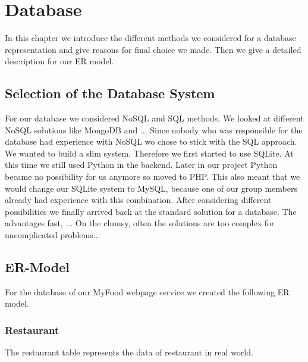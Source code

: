 \chapter{Database}

In this chapter we introduce the different methods we considered for a database representation and give reasons for final choice we made. Then we give a detailed description for our ER model.

\section{Selection of the Database System}
For our database we considered NoSQL and SQL methods. We looked at different NoSQL solutions like MongoDB and ... %
Since nobody who was responsible for the database had experience with NoSQL wo chose to stick with the SQL approach. We  wanted to build a slim system. Therefore we first started to use SQLite. At this time we still used Python in the backend. Later in our project Python became no possibility for us anymore so moved to PHP. This also meant that we would change our SQLite system to MySQL, because one of our group members already had experience with this combination. After considering different possibilities we finally arrived back at the standard solution for a database. The advantages fast, ... %
On the clumsy, often the solutions are too complex for uncomplicated problems...%


\section{ER-Model}
	For the database of our MyFood webpage service we created the following ER model.

	\subsection{Restaurant}
	The restaurant table represents the data of restaurant in real world.

